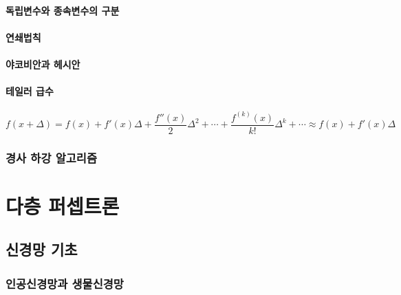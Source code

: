 \documentclass [12pt] {oblivoir}
\let\oldsubsubsection=\subsubsection
\renewcommand{\subsubsection}
{
  \filbreak
  \oldsubsubsection
}
\begin{document}
\vspace{3mm}

\paragraph*{독립변수와 종속변수의 구분}\mbox{}

\vspace{3mm}

\paragraph*{연쇄법칙}\mbox{}

\vspace{3mm}

\paragraph*{야코비안과 헤시안}\mbox{}

\vspace{3mm}

\paragraph*{테일러 급수}\mbox{}

\begin{equation} \tag{2.57}
  f(x + \Delta) = f(x) + f'(x)\Delta + \frac{f''(x)}{2}\Delta^{2} + \cdots + \frac{f^{(k)}(x)}{k!}\Delta^{k} + \cdots \approx f(x) + f'(x)\Delta
\end{equation}

\vspace{3mm}

\subsubsection{경사 하강 알고리즘}

\newpage
\section{다층 퍼셉트론}

\subsection{신경망 기초}

\subsubsection{인공신경망과 생물신경망}
\end{document}
